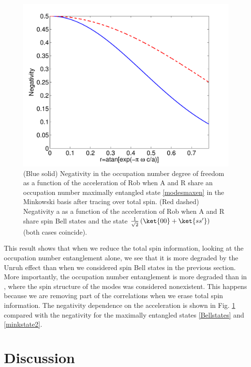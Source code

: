 \begin{figure}[H]
\begin{center}
\includegraphics[width=.85\textwidth]{mutumode}
\end{center}
\caption{(Blue solid) Negativity in the occupation number degree of freedom as a function of the acceleration of Rob when A and R share an occupation number maximally entangled state \eqref{modesmaxen} in the Minkowski basis after tracing over total spin. (Red dashed) Negativity a as a function of the acceleration of Rob when A and R share spin Bell states and the state $\frac{1}{\sqrt2}\left(\ket{00}+\ket{ss'}\right)$ (both cases coincide).}
\label{fig5}
\end{figure}

This result shows that when we reduce the total spin information, looking at the occupation number entanglement alone, we see that it is more degraded by the Unruh effect than when we considered spin Bell states in the previous section. More importantly, the occupation number entanglement is more degraded than in \cite{AlsingSchul}, where the spin structure of the modes was considered nonexistent. This happens because we are removing part of the correlations when we erase total spin information. The negativity dependence on the acceleration is shown in Fig. \ref{fig5} compared with the negativity for the maximally entangled states \eqref{Bellstates} and \eqref{minkstate2}.




\section{Discussion}\label{sec7}

